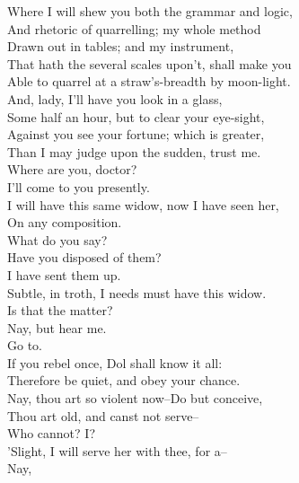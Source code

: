 \documentclass{memoir}
\begin{document}
\begin{drama*}
 Where I will shew you both the grammar and logic,\\
 And rhetoric of quarrelling; my whole method\\
 Drawn out in tables; and my instrument,\\
 That hath the several scales upon't, shall make you\\
 Able to quarrel at a straw's-breadth by moon-light.\\
 And, lady, I'll have you look in a glass,\\
 Some half an hour, but to clear your eye-sight,\\
 Against you see your fortune; which is greater,\\
 Than I may judge upon the sudden, trust me.\\
\facespeaks  Where are you, doctor?\\
\subtlespeaks {} I'll come to you presently.\\
\facespeaks {} I will have this same widow, now I have seen her,\\
 On any composition.\\
\subtlespeaks {} What do you say?\\
\facespeaks  Have you disposed of them?\\
\subtlespeaks {} I have sent them up.\\
\facespeaks  Subtle, in troth, I needs must have this widow.\\
\subtlespeaks  Is that the matter?\\
\facespeaks {} Nay, but hear me.\\
\subtlespeaks {} Go to.\\
 If you rebel once, Dol shall know it all:\\
 Therefore be quiet, and obey your chance.\\
\facespeaks  Nay, thou art so violent now--Do but conceive,\\
 Thou art old, and canst not serve--\\
\subtlespeaks {} Who cannot? I?\\
 'Slight, I will serve her with thee, for a--\\
\facespeaks {} Nay,\\

\end{drama*}
\end{document}
